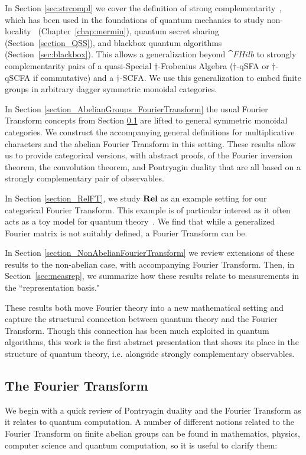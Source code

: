 In Section \ref{sec:strcompl} we cover the definition of strong complementarity~\cite{coecke2011interacting}, which has been used in the foundations of quantum mechanics to study non-locality~\cite{coecke2012strong, gogioso2015mermin} (Chapter~\ref{chap:mermin}), quantum secret sharing~\cite{gogioso2015mermin, zamdzhiev2012abstract} (Section~\ref{section_QSS}), and blackbox quantum algorithms~\cite{vicary-tqa, zeng2014abstract, zeng2015models} (Section~\ref{sec:blackbox}). This allows a generalization beyond $\cat{FHilb}$ to strongly complementarity pairs of a quasi-Special $\dagger$-Frobenius Algebra ($\dagger$-qSFA or $\dagger$-qSCFA if commutative) and a $\dagger$-SCFA. We use this generalization to embed finite groups in arbitrary dagger symmetric monoidal categories.

In Section \ref{section_AbelianGroups_FourierTransform} the usual Fourier Transform concepts from Section \ref{sec:FT} are lifted to general symmetric monoidal categories. We construct the accompanying general definitions for multiplicative characters and the abelian Fourier Transform in this setting.  These results allow us to provide categorical versions, with abstract proofs, of the Fourier inversion theorem, the convolution theorem, and Pontryagin duality that are all based on a strongly complementary pair of observables.

In Section \ref{section_RelFT}, we study $\mathbf{Rel}$ as an example setting for our categorical Fourier Transform. This example is of particular interest as it often acts as a toy model for quantum theory~\cite{evans2009classifying, cqm-notes, pavlovic2009quantum, zeng2015models}.  We find that while a generalized Fourier matrix is not suitably defined, a Fourier Transform can be.

In Section \ref{section_NonAbelianFourierTransform} we review extensions of these results to the non-abelian case, with accompanying Fourier Transform. Then, in Section~\ref{sec:measrep}, we summarize how these results relate to measurements in the ``representation basis."

These results both move Fourier theory into a new mathematical setting and capture the structural connection between quantum theory and the Fourier Transform.  Though this connection has been much exploited in quantum algorithms, this work is the first abstract presentation that shows its place in the structure of quantum theory, i.e. alongside strongly complementary observables.
\subsection{The Fourier Transform}
\label{sec:FT}
We begin with a quick review of Pontryagin duality and the Fourier Transform as it relates to quantum computation. A number of different notions related to the Fourier Transform on finite abelian groups can be found in mathematics, physics, computer science and quantum computation, so it is useful to clarify them:

